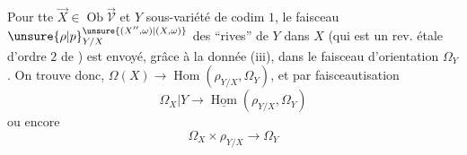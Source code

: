  Pour tte $\vec X\in\operatorname{Ob}\vec{\mathcal V}$ et $Y$ sous-variété de codim $1$, le faisceau $\unsure{\rho|p}_{Y/X}^{\unsure{(X'',\omega)|(X,\omega)}}$ des ``rives'' de $Y$ dans $X$ (qui est un rev. étale d'ordre $2$ de ) est envoyé, grâce à la donnée (iii), dans le faisceau d'orientation $\Omega_Y$. On trouve donc,  $\Omega(X)\to\operatorname{Hom}(\rho_{Y/X},\Omega_Y)$, et par faisceautisation
\[
\Omega_X|Y\longrightarrow\underline{\operatorname{Hom}}(\rho_{Y/X},\Omega_Y)
\]
ou encore
\[
\Omega_X\times\rho_{Y/X}\longrightarrow\Omega_Y
\]
